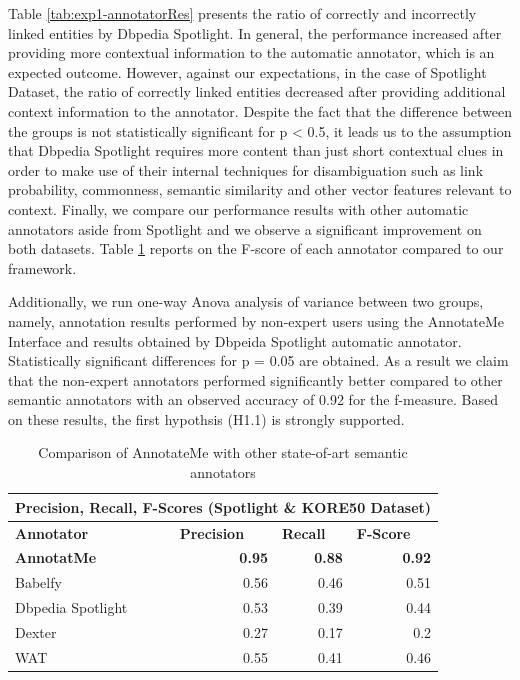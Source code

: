 Table \ref{tab:exp1-annotatorRes} presents the ratio of correctly and incorrectly linked entities by Dbpedia Spotlight. In general, the performance increased after providing more contextual information to the automatic annotator, which is an expected outcome. However, against our expectations, in the case of Spotlight Dataset, the ratio of correctly linked entities decreased after providing additional context information to the annotator. Despite the fact that the difference between the groups is not statistically significant for p < 0.5, it leads us to the assumption that Dbpedia Spotlight requires more content than just short contextual clues in order to make use of their internal techniques for disambiguation such as link probability, commonness, semantic similarity and other vector features relevant to context. Finally, we compare our performance results with other automatic annotators aside from Spotlight and we observe a significant improvement on both datasets. Table \ref{tab:exp1-annotatos-comparison} reports on the F-score of each annotator compared to our framework. 

Additionally, we run one-way Anova analysis of variance between two groups, namely, annotation results performed by non-expert users using the AnnotateMe Interface and results obtained by Dbpeida Spotlight automatic annotator. Statistically significant differences for p = 0.05 are obtained. As a result we claim that the non-expert annotators performed significantly better compared to other semantic annotators with an observed accuracy of 0.92 for the f-measure. Based on these results, the first hypothsis (H1.1) is strongly supported.

\begin{table}[htbp]
  \centering
  \caption{Comparison of AnnotateMe with other state-of-art semantic annotators}
    \begin{tabular}{|l|r|r|r|}
    \toprule
    \multicolumn{4}{|c|}{\textbf{Precision, Recall, F-Scores (Spotlight \& KORE50 Dataset)}} \\
    \midrule
    \textbf{Annotator} & \multicolumn{1}{l|}{\textbf{Precision}} & \multicolumn{1}{l|}{\textbf{Recall}} & \multicolumn{1}{l|}{\textbf{F-Score}} \\
    \midrule
    \textcolor[rgb]{ .8,  0,  0}{\textbf{AnnotatMe}} & \textcolor[rgb]{ .8,  0,  0}{\textbf{0.95}} & \textcolor[rgb]{ .8,  0,  0}{\textbf{0.88}} & \textcolor[rgb]{ .8,  0,  0}{\textbf{0.92}} \\
    \midrule
    Babelfy & 0.56  & 0.46  & 0.51 \\
    \midrule
    Dbpedia Spotlight & 0.53  & 0.39  & 0.44 \\
    \midrule
    Dexter & 0.27  & 0.17  & 0.2 \\
    \midrule
    WAT   & 0.55  & 0.41  & 0.46 \\
    \bottomrule
    \end{tabular}%
  \label{tab:exp1-annotatos-comparison}%
\end{table}%

